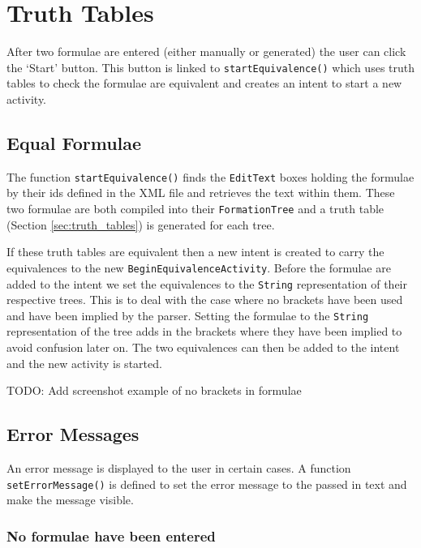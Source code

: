 \documentclass{report}
\begin{document}
\section{Truth Tables}
\label{sec:app_truth_tables}

After two formulae are entered (either manually or generated) the user can click the `Start' button. This button is linked to {\tt startEquivalence()} which uses truth tables to check the formulae are equivalent and creates an intent to start a new activity.

\subsection{Equal Formulae}
\label{sub:equal_equivalences}

The function {\tt startEquivalence()} finds the {\tt EditText} boxes holding the formulae by their ids defined in the XML file and retrieves the text within them. These two formulae are both compiled into their {\tt FormationTree} and a truth table (Section \ref{sec:truth_tables}) is generated for each tree. 

If these truth tables are equivalent then a new intent is created to carry the equivalences to the new {\tt BeginEquivalenceActivity}. Before the formulae are added to the intent we set the equivalences to the {\tt String} representation of their respective trees. This is to deal with the case where no brackets have been used and have been implied by the parser. Setting the formulae to the {\tt String} representation of the tree adds in the brackets where they have been implied to avoid confusion later on. The two equivalences can then be added to the intent and the new activity is started.

TODO: Add screenshot example of no brackets in formulae

\subsection{Error Messages}
\label{sub:error_messages}

An error message is displayed to the user in certain cases. A function {\tt setErrorMessage()} is defined to set the error message to the passed in text and make the message visible.

\subsubsection{No formulae have been entered}
\end{document}
